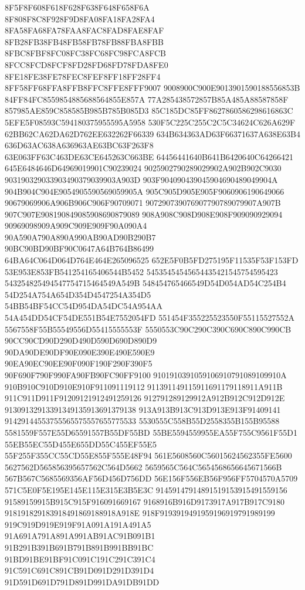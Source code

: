 8F5F8F608F618F628F638F648F658F6A
8F808F8C8F928F9D8FA08FA18FA28FA4
8FA58FA68FA78FAA8FAC8FAD8FAE8FAF
8FB28FB38FB48FB58FB78FB88FBA8FBB
8FBC8FBF8FC08FC38FC68FC98FCA8FCB
8FCC8FCD8FCF8FD28FD68FD78FDA8FE0
8FE18FE38FE78FEC8FEF8FF18FF28FF4
8FF58FF68FFA8FFB8FFC8FFE8FFF9007
9008900C900E9013901590188556853B
84FF84FC8559854885688564855E857A
77A285438572857B85A485A88587858F
857985AE859C858585B985B785B085D3
85C185DC85FF8627860586298616863C
5EFE5F08593C594180375955595A5958
530F5C225C255C2C5C34624C626A629F
62BB62CA62DA62D762EE632262F66339
634B634363AD63F66371637A638E63B4
636D63AC638A636963AE63BC63F263F8
63E063FF63C463DE63CE645263C663BE
64456441640B641B6420640C64266421
645E6484646D64969019901C90239024
9025902790289029902A902B902C9030
903190329033903490379039903A903D
903F904090439045904690489049904A
904B904C904E9054905590569059905A
905C905D905E905F9060906190649066
90679069906A906B906C906F90709071
907290739076907790789079907A907B
907C907E908190849085908690879089
908A908C908D908E908F909090929094
90969098909A909C909E909F90A090A4
90A590A790A890A990AB90AD90B290B7
90BC90BD90BF90C0647A64B764B86499
64BA64C064D064D764E464E265096525
652E5F0B5FD275195F11535F53F153FD
53E953E853FB541254165406544B5452
54535454545654435421545754595423
543254825494547754715464549A549B
548454765466549D54D054AD54C254B4
54D254A754A654D354D4547254A354D5
54BB54BF54CC54D954DA54DC54A954AA
54A454DD54CF54DE551B54E7552054FD
551454F355225523550F55115527552A
5567558F55B55549556D55415555553F
5550553C90C290C390C690C890C990CB
90CC90CD90D290D490D590D690D890D9
90DA90DE90DF90E090E390E490E590E9
90EA90EC90EE90F090F190F290F390F5
90F690F790F990FA90FB90FC90FF9100
9101910391059106910791089109910A
910B910C910D910E910F911091119112
911391149115911691179118911A911B
911C911D911F91209121912491259126
912791289129912A912B912C912D912E
91309132913391349135913691379138
913A913B913C913D913E913F91409141
91429144553755565575557655775533
5530555C558B55D2558355B155B95588
5581559F557E55D65591557B55DF55BD
55BE5594559955EA55F755C9561F55D1
55EB55EC55D455E655DD55C455EF55E5
55F255F355CC55CD55E855F555E48F94
561E5608560C56015624562355FE5600
5627562D565856395657562C564D5662
5659565C564C5654568656645671566B
567B567C5685569356AF56D456D756DD
56E156F556EB56F956FF5704570A5709
571C5E0F5E195E145E115E315E3B5E3C
91459147914891519153915491559156
91589159915B915C915F916091669167
9168916B916D9173917A917B917C9180
918191829183918491869188918A918E
918F9193919491959196919791989199
919C919D919E919F91A091A191A491A5
91A691A791A891A991AB91AC91B091B1
91B291B391B691B791B891B991BB91BC
91BD91BE91BF91C091C191C291C391C4
91C591C691C891CB91D091D291D391D4
91D591D691D791D891D991DA91DB91DD
